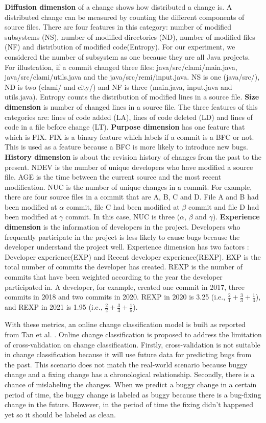 \textbf{Diffusion dimension} of a change shows how distributed a change is.
A distributed change can be measured by counting the different components of source files.
There are four features in this category: number of modified subsystems (NS), number of modified directories (ND), number of modified files (NF) and distribution of modified code(Entropy).
For our experiment, we considered the number of subsystem as one because they are all Java projects.
For illustration, if a commit changed three files: java/src/clami/main.java, java/src/clami/utils.java and the java/src/remi/input.java.
NS is one (java/src/), ND is two (clami/ and city/) and NF is three (main.java, input.java and utils.java).
Entropy counts the distribution of modified lines in a source file.
\textbf{Size dimension} is number of changed lines in a source file.
The three features of this categories are: lines of code added (LA), lines of code deleted (LD) and lines of code in a file before change (LT).
\textbf{Purpose dimension} has one feature that which is FIX.
FIX is a binary feature which labels if a commit is a BFC or not.
This is used as a feature because a BFC is more likely to introduce new bugs.
\textbf{History dimension} is about the revision history of changes from the past to the present.
NDEV is the number of unique developers who have modified a source file.
AGE is the time between the current source and the most recent modification.
NUC is the number of unique changes in a commit.
For example, there are four source files in a commit that are A, B, C and D. File A and B had been modified at $\alpha$ commit, file C had been modified at $\beta$ commit and file D had been modified at $\gamma$ commit.
In this case, NUC is three ($\alpha$, $\beta$ and $\gamma$). 
\textbf{Experience dimension} is the information of developers in the project.
Developers who frequently participate in the project is less likely to cause bugs because the developer understand the project well.
Experience dimension has two factors : Developer experience(EXP) and Recent developer experience(REXP).
EXP is the total number of commits the developer has created.
REXP is the number of commits that have been weighted according to the year the developer participated in.
A developer, for example, created one commit in 2017, three commits in 2018 and two commits in 2020.
REXP in 2020 is 3.25 (i.e., $\frac{2}{1} + \frac{3}{3}  + \frac{1}{4}$), and REXP in 2021 is 1.95 (i.e., $\frac{2}{2} + \frac{3}{4}  + \frac{1}{5}$).

With these metrics, an online change classification model is built as reported from Tan et al. \cite{tan2015online}.
Online change classification is proposed to address the limitation of cross-validation on change classification.
Firstly, cross-validation is not suitable in change classification because it will use future data for predicting bugs from the past.
This scenario does not match the real-world scenario because buggy change and a fixing change has a chronological relationship.
Secondly, there is a chance of mislabeling the changes. 
When we predict a buggy change in a certain period of time, the buggy change is labeled as buggy because there is a bug-fixing change in the future.
However, in the period of time the fixing didn't happened yet so it should be labeled as clean.

